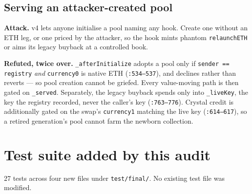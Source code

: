 \documentclass[11pt,a4paper]{article}
\newcommand{\code}[1]{\texttt{\small #1}}
\newcommand{\fileref}[1]{\texttt{\scriptsize #1}}
\begin{document}
\subsection*{Serving an attacker-created pool}
\textbf{Attack.} v4 lets anyone initialise a pool naming any hook. Create one
without an ETH leg, or one priced by the attacker, so the hook mints phantom
\code{relaunchETH} or aims its legacy buyback at a controlled book.

\textbf{Refuted, twice over.} \code{\_afterInitialize} adopts a pool only if
\code{sender == registry} \emph{and} \code{currency0} is native ETH
(\fileref{:534--537}), and declines rather than reverts --- so pool creation cannot
be griefed. Every value-moving path is then gated on \code{\_served}. Separately,
the legacy buyback spends only into \code{\_liveKey}, the key the registry
recorded, never the caller's key (\fileref{:763--776}). Crystal credit is
additionally gated on the swap's \code{currency1} matching the live key
(\fileref{:614--617}), so a retired generation's pool cannot farm the newborn
collection.

\newpage
\section{Test suite added by this audit}

27 tests across four new files under \code{test/final/}. No existing test file
was modified.
\end{document}
